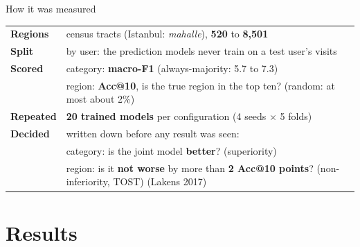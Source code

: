 \documentclass{beamer}
\newcommand{\scite}[1]{{\color{black!60}\footnotesize(#1)}}
\begin{document}
\begin{frame}{How it was measured}
    \vspace{0pt}%
    \small
    \setlength{\tabcolsep}{6pt}
    \renewcommand{\arraystretch}{1.3}
    \begin{tabular}{@{}p{}p{}@{}}
        \toprule
        \textbf{Regions}  & census tracts (Istanbul: \emph{mahalle}), \textbf{520} to \textbf{8,501} \\
        \textbf{Split}    & by user: the prediction models never train on a test user's visits \\
        \textbf{Scored}   & category: \textbf{macro-F1} (always-majority: 5.7 to 7.3) \\
                          & region: \textbf{Acc@10}, is the true region in the top ten?
                            (random: at most about 2\%) \\
        \textbf{Repeated} & \textbf{20 trained models} per configuration (4 seeds $\times$ 5 folds) \\
        \textbf{Decided}  & \leavevmode\textcolor{alert}{written down before any result was seen}: \\
                          & category: is the joint model \textbf{better}? (superiority) \\
                          & region: is it \textbf{not worse} by more than \textbf{2 Acc@10 points}?
                            (non-inferiority, TOST) \scite{Lakens 2017} \\
        \bottomrule
    \end{tabular}
\end{frame}

\section{Results}
\end{document}
